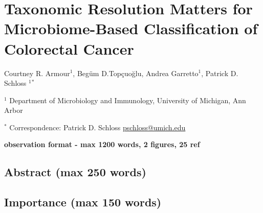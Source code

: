 \documentclass[]{article}
\author{}
\date{\vspace{-2.5em}}
\begin{document}
\section{Taxonomic Resolution Matters for Microbiome-Based
Classification of Colorectal
Cancer}\label{taxonomic-resolution-matters-for-microbiome-based-classification-of-colorectal-cancer}

\vspace{10mm}

Courtney R. Armour${^1}$, Begüm D.Topçuoğlu, Andrea Garretto${^1}$,
Patrick D. Schloss ${^1}$${^*}$

\vspace{5mm}

${^1}$ Department of Microbiology and Immunology, University of
Michigan, Ann Arbor

\vspace{5mm}

${^*}$ Correspondence: Patrick D. Schloss
\href{mailto:pschloss@umich.edu}{pschloss@umich.edu}

\vspace{20mm}

\textbf{observation format - max 1200 words, 2 figures, 25 ref}

\newpage

\subsection{Abstract (max 250 words)}\label{abstract-max-250-words}

\subsection{Importance (max 150 words)}\label{importance-max-150-words}

\newpage
\end{document}
